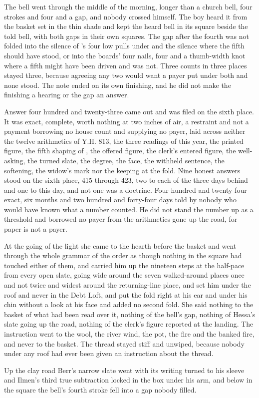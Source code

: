 The bell went through the middle of the morning, longer than a church bell, four strokes and four and a gap, and nobody crossed himself. The boy heard it from the basket set in the thin shade and kept the heard bell in its square beside the told bell, with both gaps in their own squares. The gap after the fourth was not folded into the silence of 's four low pulls under  and the silence where the fifth should have stood, or into the boards' four nails, four and a thumb-width knot where a fifth might have been driven and was not. Three counts in three places stayed three, because agreeing any two would want a payer put under both and none stood. The note ended on its own finishing, and he did not make the finishing a hearing or the gap an answer.

Answer four hundred and twenty-three came out and was filed on the sixth place. It was exact, complete, worth nothing at two inches of air, a restraint and not a payment borrowing no house count and supplying no payer, laid across neither the twelve arithmetics of Y.H. 813, the three readings of this year, the printed figure, the fifth shaping of , the offered figure, the clerk's entered figure, the well-asking, the turned slate, the degree, the face, the withheld sentence, the softening, the widow's mark nor the keeping at the fold. Nine honest answers stood on the sixth place, 415 through 423, two to each of the three days behind and one to this day, and not one was a doctrine. Four hundred and twenty-four exact, six months and two hundred and forty-four days told by nobody who would have known what a number counted. He did not stand the number up as a threshold and borrowed no payer from the arithmetics gone up the road, for paper is not a payer.

At the going of the light she came to the hearth before the basket and went through the whole grammar of the order as though nothing in the square had touched either of them, and carried him up the nineteen steps at the half-pace from every open slate, going wide around the seven walked-around places once and not twice and widest around the returning-line place, and set him under the roof and never in the Debt Loft, and put the fold right at his ear and under his chin without a look at his face and added no second fold. She said nothing to the basket of what had been read over it, nothing of the bell's gap, nothing of Hessa's slate going up the road, nothing of the clerk's figure reported at the landing. The instruction went to the wool, the river wind, the pot, the fire and the banked fire, and never to the basket. The thread stayed stiff and unwiped, because nobody under any roof had ever been given an instruction about the thread.

Up the clay road Berr's narrow slate went with its writing turned to his sleeve and Ilmen's third true subtraction locked in the box under his arm, and below in the square the bell's fourth stroke fell into a gap nobody filled.
